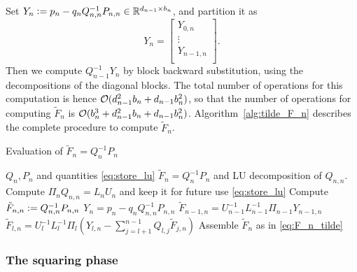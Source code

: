 Set $Y_n \mathrel{\mathop:}= p_n - q_n Q_{n,n}^{-1} P_{n,n} \in {\mathbb R}^{d_{n-1} \times
b_n}$, and partition it as
\begin{equation*}
    Y_n = 
    \begin{bmatrix}
      Y_{0,n} \\
      \vdots  \\
      Y_{n-1,n} \\
    \end{bmatrix}.
\end{equation*}
Then we compute $Q_{n-1}^{-1} Y_n$ by block backward
substitution, using the decompositions of the diagonal blocks.  The
total number of operations for this computation is hence ${\mathcal O}(d_{n-1}^2 b_n + d_{n-1} b_n^2)$, so that the number of
operations for computing $\tilde{F}_n$ is ${\mathcal O}(b_n^3 + d_{n-1}^2
b_n + d_{n-1} b_n^2)$.
Algorithm~\ref{alg:tilde_F_n} describes the complete procedure to compute $\tilde{F}_n$.

\begin{algorithm}[ht]
    \caption{Evaluation of $\tilde{F}_n = Q_n^{-1} P_n$}
    \label{alg:tilde_F_n}
    \begin{algorithmic}[1]
        \REQUIRE $Q_n, P_n$ and quantities \eqref{eq:store_lu}
        \ENSURE $\tilde{F}_n = Q_n^{-1} P_n$ and LU decomposition of $Q_{n,n}$.
        \STATE Compute $\Pi_n Q_{n,n}= L_n U_n$ and keep it for future use \eqref{eq:store_lu}
        \STATE Compute  $\tilde{F}_{n,n} \mathrel{\mathop:}= Q_{n,n}^{-1} P_{n,n}$
        \STATE $Y_n = p_n - q_n Q_{n,n}^{-1} P_{n,n}$
        \STATE $\tilde{F}_{n-1,n} = U_{n-1}^{-1} L_{n-1}^{-1} \Pi_{n-1} Y_{n-1,n} $
        \STATE $\tilde{F}_{l, n} = U_{l}^{-1}L_{l}^{-1} \Pi_{l}(Y_{l, n}-\sum_{j=l+1}^{n-1} Q_{l,j}\tilde{F}_{j, n}) $
        \ENDFOR
        \STATE Assemble $\tilde{F}_n$ as in \eqref{eq:F_n_tilde}
    \end{algorithmic}
\end{algorithm}
\subsubsection{The squaring phase}

